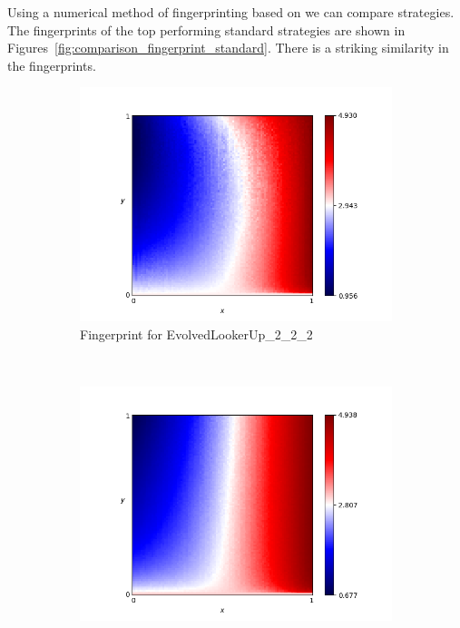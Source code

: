 \documentclass{article}
\begin{document}
Using a numerical method of fingerprinting based on
\cite{ashlock2008fingerprinting, ashlock2009fingerprint} we can compare
strategies. The fingerprints of the top performing standard strategies are shown
in Figures~\ref{fig:comparison_fingerprint_standard}. There is a striking
similarity in the fingerprints.

\begin{figure}[!hbtp]
    \centering
    \begin{subfigure}[t]{.3\textwidth}
        \centering
        \includegraphics[width=\textwidth]{./assets/EvolvedLookerUp2_2_2.png}
        \caption{Fingerprint for EvolvedLookerUp\_2\_2\_2}
    \end{subfigure}%
    ~
    \begin{subfigure}[t]{.3\textwidth}
        \centering
        \includegraphics[width=\textwidth]{./assets/Evolved_HMM_5.png}

\end{subfigure}
\end{figure}
\end{document}
